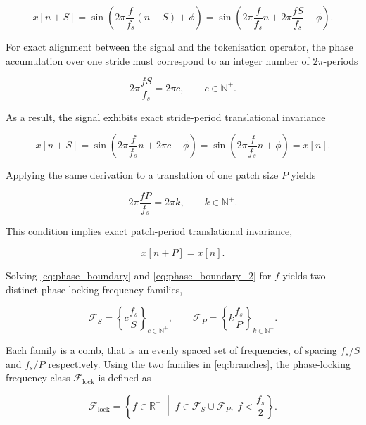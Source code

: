 \begin{equation*}
x[n+S]
=
\sin\!\left(
2\pi\frac{f}{f_s}(n+S)+\phi
\right)
=
\sin\!\left(
2\pi\frac{f}{f_s}n
+
2\pi\frac{fS}{f_s}
+
\phi
\right).
\end{equation*}

For exact alignment between the signal and the tokenisation operator, the phase accumulation over one stride must correspond to an integer number of $2\pi$-periods

\begin{equation}
\label{eq:phase_boundary}
2\pi\frac{fS}{f_s}
=
2\pi c,
\qquad
c\in\mathbb{N}^{+}.
\end{equation}

As a result, the signal exhibits exact stride-period translational invariance

\begin{equation*}
x[n+S]
=
\sin\!\left(
2\pi\frac{f}{f_s}n
+
2\pi c
+
\phi
\right)
=
\sin\!\left(
2\pi\frac{f}{f_s}n
+\phi
\right)
=
x[n].
\end{equation*}

Applying the same derivation to a translation of one patch size $P$ yields

\begin{equation}
\label{eq:phase_boundary_2}
2\pi\frac{fP}{f_s}
=
2\pi k,
\qquad
k\in\mathbb{N}^{+}.
\end{equation}

This condition implies exact patch-period translational invariance,

\begin{equation*}
x[n+P]
=
x[n].
\end{equation*}

Solving \autoref{eq:phase_boundary} and \autoref{eq:phase_boundary_2} for $f$ yields two distinct phase-locking frequency families,

\begin{equation}
\label{eq:branches}
\mathcal{F}_{S}
=
\left\{
c\frac{f_s}{S}
\right\}_{c\in\mathbb{N}^{+}},
\qquad
\mathcal{F}_{P}
=
\left\{
k\frac{f_s}{P}
\right\}_{k\in\mathbb{N}^{+}}.
\end{equation}

Each family is a comb, that is an evenly spaced set of frequencies, of spacing $f_s/S$ and $f_s/P$ respectively. Using the two families in \autoref{eq:branches}, the phase-locking frequency class $\mathcal{F}_{\mathrm{lock}}$ is defined as

\begin{equation}
\label{eq:flock}
\mathcal F_{\mathrm{lock}}
=
\left\{
f\in\mathbb{R}^{+}
\;\middle|\;
f\in\mathcal{F}_{S}\cup\mathcal{F}_{P},
\;
f<\frac{f_s}{2}
\right\}.
\end{equation}

